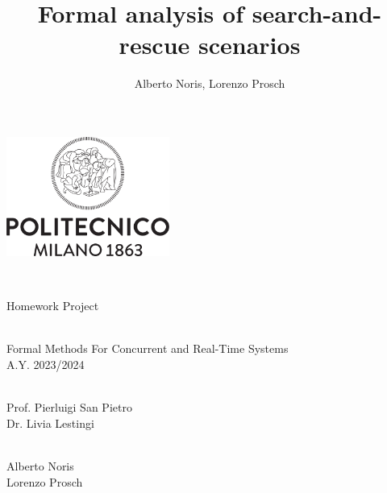 \documentclass[a4paper,11pt]{article}
\author{Alberto Noris, Lorenzo Prosch}
\title{Formal analysis of search-and-rescue scenarios}
\newcommand{\paragraphfontsize}{\fontsize{11}{12}\selectfont}
\begin{document}
	
	\begin{center}
		
		\thispagestyle{empty}	%
		
		\includegraphics[width=0.4\textwidth]{root/images/extra/Logo_poli}
		
		\vspace{2cm}
		
		\textbf{\fontsize{32}{\baselineskip}\selectfont {Formal analysis of search-and-rescue scenarios}}\\
		
		\vspace{0.6cm}
		
		\fontsize{18}{\baselineskip}\selectfont Homework Project\\
		
		\vspace{2cm}
		
		\textbf{\fontsize{24}{\baselineskip}\selectfont{Course name}}\\ 	{
			\setlength{\baselineskip}{1.4\baselineskip}
			Formal Methods For Concurrent and Real-Time Systems\\
			A.Y. 2023/2024\\
		}
		
		\vspace{1cm}
		
		\textbf{\fontsize{24}{\baselineskip}\selectfont{Instructors}}\\
		{
			\setlength{\baselineskip}{1.4\baselineskip}
			Prof. Pierluigi San Pietro\\
			Dr. Livia Lestingi\\
		}
		
		\vspace{2cm}
		
		\textbf{\fontsize{24}{\baselineskip}\selectfont{Authors}}\\
		{
			\setlength{\baselineskip}{1.4\baselineskip}
			Alberto Noris\\
			Lorenzo Prosch\\
		}
		
	\end{center}
	
	
	\clearpage
	\hypersetup{linkcolor=black}
	\tableofcontents
	\thispagestyle{empty}
	
	\renewcommand{\rmdefault}{phv}
	\renewcommand{\normalsize}{\paragraphfontsize}
	\newpage

	
	
	
	
	
\end{document}
